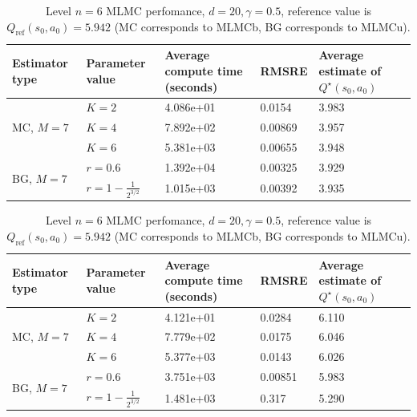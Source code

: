 \documentclass[11pt]{article}
\numberwithin{equation}{section}
\theoremstyle{definition}
\theoremstyle{remark}
\begin{document}
\begin{table}[htbp]
\centering
\begin{tabular}{
p{2cm}
p{2cm}
p{3cm}
p{3cm}
p{3cm}
}
\toprule
Estimator type & Parameter value &  Average compute time (seconds) & RMSRE & Average estimate of $Q^\star(s_0,a_0)$ \\
\midrule
\multirow{3}{*}{MC, $M = 7$} & $K = 2$ & 4.086e+01 & 0.0154 & 3.983\\
 & $K = 4$ & 7.892e+02 & 0.00869 & 3.957 \\
 & $K = 6$ & 5.381e+03 & 0.00655& 3.948\\
\midrule
\multirow{2}{*}{BG, $M = 7$} & $r = 0.6$ & 1.392e+04 & 0.00325 & 3.929 \\
 & $r = 1 - \frac{1}{2^{3/2}}$ & 1.015e+03 & 0.00392 & 3.935 \\
\bottomrule
\end{tabular}
\caption{Level $n=6$ MLMC perfomance, $d=20, \gamma=0.4$, reference value is $Q_{\mathrm{ref}} (s_0, a_0) = 3.923$ (MC corresponds to MLMCb, BG corresponds to MLMCu).}
\label{tab:results_gamma04}


\begin{tabular}{
p{2cm}
p{2cm}
p{3cm}
p{3cm}
p{3cm}
}
\toprule
Estimator type & Parameter value &  Average compute time (seconds) & RMSRE & Average estimate of $Q^\star(s_0,a_0)$ \\
\midrule
\multirow{3}{*}{MC, $M = 7$} & $K = 2$ & 4.121e+01 & 0.0284 & 6.110\\
 & $K = 4$ & 7.779e+02 & 0.0175 & 6.046 \\
 & $K = 6$ & 5.377e+03 & 0.0143 & 6.026 \\
\midrule
\multirow{2}{*}{BG, $M = 7$} & $r = 0.6$ & 3.751e+03 & 0.00851 & 5.983 \\
 & $r = 1 - \frac{1}{2^{3/2}}$ & 1.481e+03 & 0.317 & 5.290 \\
\bottomrule
\end{tabular}
\caption{Level $n=6$ MLMC perfomance, $d=20, \gamma=0.5$, reference value is $Q_{\mathrm{ref}} (s_0, a_0) = 5.942$ (MC corresponds to MLMCb, BG corresponds to MLMCu).}
\label{tab:results_gamma05}



\end{table}
\end{document}
